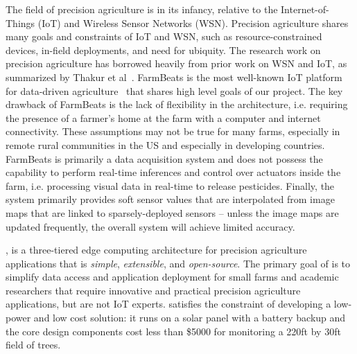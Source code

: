 The field of precision agriculture is in its infancy, relative to the Internet-of-Things (IoT) and Wireless Sensor Networks (WSN). Precision agriculture shares many goals and constraints of IoT and WSN, such as resource-constrained devices, in-field deployments, and need for ubiquity. The research work on precision agriculture has borrowed heavily from prior work on WSN and IoT, as summarized by Thakur et al~\cite{thakur2019applicability}. FarmBeats is the most well-known IoT platform for data-driven agriculture~\cite{vasisht2017farmbeats, kapetanovic2017experiences, jain2019low} that shares high level goals of our project. The key drawback of FarmBeats is the lack of flexibility in the architecture, i.e. requiring the presence of a farmer's home at the farm with a computer and internet connectivity. These assumptions may not be true for many farms, especially in remote rural communities in the US and especially in developing countries. FarmBeats is primarily a data acquisition system and does not possess the capability to perform real-time inferences and control over actuators inside the farm, i.e. processing visual data in real-time to release pesticides. Finally, the system primarily provides soft sensor values that are interpolated from image maps that are linked to sparsely-deployed sensors -- unless the image maps are updated frequently, the overall system will achieve limited accuracy. 



\myname, is a three-tiered edge computing architecture for precision agriculture applications that is \emph{simple}, \emph{extensible}, and \emph{open-source}. The primary goal of \myname{} is to simplify data access and application deployment for small farms and academic researchers that require innovative and practical precision agriculture applications, but are not IoT experts. 
\myname{} satisfies the constraint of developing a low-power and low cost solution: it runs on a solar panel with a battery backup and the core design components cost less than \$5000 for monitoring a 220ft by 30ft field of trees. 

